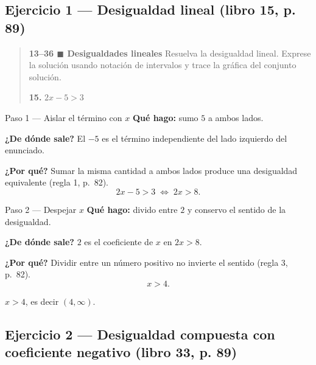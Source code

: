 \documentclass[11pt]{article}
\begin{document}
\subsection*{Ejercicio 1 --- Desigualdad lineal (libro 15, p. 89)}

\begin{quote}
\textbf{13--36 $\blacksquare$ Desigualdades lineales} \; Resuelva la desigualdad lineal. Exprese la solución usando notación de intervalos y trace la gráfica del conjunto solución.

\textbf{15.} $2x-5>3$
\end{quote}

\begin{paso}{Paso 1 --- Aislar el término con $x$}
\textbf{Qué hago:} sumo $5$ a ambos lados.

\textbf{¿De dónde sale?} El $-5$ es el término independiente del lado izquierdo del enunciado.

\textbf{¿Por qué?} Sumar la misma cantidad a ambos lados produce una desigualdad equivalente (regla 1, p.~82).
\[
2x-5>3 \;\Longleftrightarrow\; 2x>8.
\]
\end{paso}

\begin{paso}{Paso 2 --- Despejar $x$}
\textbf{Qué hago:} divido entre $2$ y conservo el sentido de la desigualdad.

\textbf{¿De dónde sale?} $2$ es el coeficiente de $x$ en $2x>8$.

\textbf{¿Por qué?} Dividir entre un número positivo no invierte el sentido (regla 3, p.~82).
\[
x>4.
\]
\end{paso}

\begin{center}
\end{center}

\begin{resp}
$x>4$, es decir $(4,\infty)$.
\end{resp}

\subsection*{Ejercicio 2 --- Desigualdad compuesta con coeficiente negativo (libro 33, p. 89)}
\end{document}
